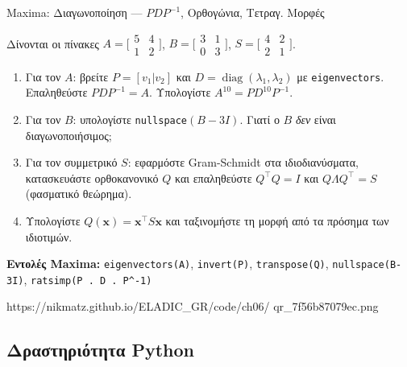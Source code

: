 %

\casactivbox%
  {Maxima: Διαγωνοποίηση — $PDP^{-1}$, Ορθογώνια, Τετραγ. Μορφές}%
  {%
    \label{cas:ch6_diagonalization}
    Δίνονται οι πίνακες
    $A=\bigl[\begin{smallmatrix}5&4\\1&2\end{smallmatrix}\bigr]$,
    $B=\bigl[\begin{smallmatrix}3&1\\0&3\end{smallmatrix}\bigr]$,
    $S=\bigl[\begin{smallmatrix}4&2\\2&1\end{smallmatrix}\bigr]$.
    \begin{enumerate}[label=(\alph*),itemsep=2pt]
      \item Για τον $A$: βρείτε $P=[v_1|v_2]$ και $D=\operatorname{diag}(\lambda_1,\lambda_2)$
        με \texttt{eigenvectors}. Επαληθεύστε $PDP^{-1}=A$.
        Υπολογίστε $A^{10}=PD^{10}P^{-1}$.
      \item Για τον $B$: υπολογίστε \texttt{nullspace}$(B-3I)$.
        Γιατί ο $B$ \emph{δεν} είναι διαγωνοποιήσιμος;
      \item Για τον συμμετρικό $S$: εφαρμόστε Gram-Schmidt στα
        ιδιοδιανύσματα, κατασκευάστε ορθοκανονικό $Q$ και
        επαληθεύστε $Q^\top Q=I$ και $Q\Lambda Q^\top=S$
        (φασματικό θεώρημα).
      \item Υπολογίστε $Q(\mathbf{x})=\mathbf{x}^\top S\mathbf{x}$ και
        ταξινομήστε τη μορφή από τα πρόσημα των ιδιοτιμών.
    \end{enumerate}
    \smallskip
    \textbf{Εντολές Maxima:}
    \texttt{eigenvectors(A)}, \texttt{invert(P)},
    \texttt{transpose(Q)}, \texttt{nullspace(B-3I)},
    \texttt{ratsimp(P . D . P\^{}-1)}
  }%
  {https://nikmatz.github.io/ELADIC_GR/code/ch06/}%
  {qr_7f56b87079ec.png}

\subsection*{Δραστηριότητα Python}

